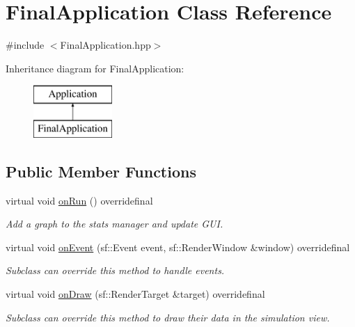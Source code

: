 \hypertarget{class_final_application}{\section{Final\-Application Class Reference}
\label{class_final_application}
}


{\ttfamily \#include $<$Final\-Application.\-hpp$>$}

Inheritance diagram for Final\-Application\-:\begin{figure}[H]
\begin{center}
\leavevmode
\includegraphics[height=2.000000cm]{class_final_application}
\end{center}
\end{figure}
\subsection*{Public Member Functions}
\begin{DoxyCompactItemize}
\item 
virtual void \hyperlink{class_final_application_acc4ece0398523f937ba601f006049efb}{on\-Run} () overridefinal
\begin{DoxyCompactList}\small\item\em Add a graph to the stats manager and update G\-U\-I. \end{DoxyCompactList}\item 
virtual void \hyperlink{class_final_application_a855c3f89d43c92e216a31d39d3ca3ce6}{on\-Event} (sf\-::\-Event event, sf\-::\-Render\-Window \&window) overridefinal
\begin{DoxyCompactList}\small\item\em Subclass can override this method to handle events. \end{DoxyCompactList}\item 
virtual void \hyperlink{class_final_application_afd3b9ffb92088376f27d72c12f90643d}{on\-Draw} (sf\-::\-Render\-Target \&target) overridefinal
\begin{DoxyCompactList}\small\item\em Subclass can override this method to draw their data in the simulation view. \end{DoxyCompactList}\end{DoxyCompactItemize}


